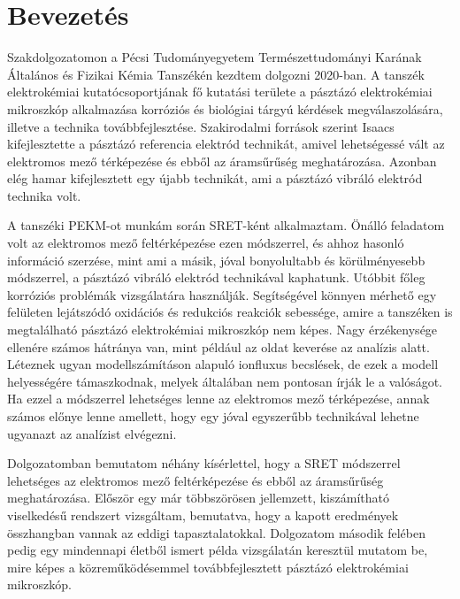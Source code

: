 \chapter{Bevezetés}
\pagestyle{headings}

Szakdolgozatomon a Pécsi Tudományegyetem Természettudományi Karának Általános és Fizikai Kémia Tanszékén kezdtem dolgozni 2020-ban. A tanszék elektrokémiai kutatócsoportjának fő kutatási területe a pásztázó elektrokémiai mikroszkóp alkalmazása korróziós és biológiai tárgyú kérdések megválaszolására, illetve a technika továbbfejlesztése. Szakirodalmi források szerint Isaacs kifejlesztette a pásztázó referencia elektród technikát, amivel lehetségessé vált az elektromos mező térképezése és ebből az áramsűrűség meghatározása. Azonban elég hamar kifejlesztett egy újabb technikát, ami a pásztázó vibráló elektród technika volt.

A tanszéki PEKM-ot munkám során SRET-ként alkalmaztam. Önálló feladatom volt az elektromos mező feltérképezése ezen módszerrel, és ahhoz hasonló információ szerzése, mint ami a másik, jóval bonyolultabb és körülményesebb módszerrel, a pásztázó vibráló elektród technikával kaphatunk. Utóbbit főleg korróziós problémák vizsgálatára használják. Segítségével könnyen mérhető egy felületen lejátszódó oxidációs és redukciós reakciók sebessége, amire a tanszéken is megtalálható pásztázó elektrokémiai mikroszkóp nem képes. Nagy érzékenysége ellenére számos hátránya van, mint például az oldat keverése az analízis alatt. Léteznek ugyan modellszámításon alapuló ionfluxus becslések, de ezek a modell helyességére támaszkodnak, melyek általában nem pontosan írják le a valóságot. Ha ezzel a módszerrel lehetséges lenne az elektromos mező térképezése, annak számos előnye lenne amellett, hogy egy jóval egyszerűbb technikával lehetne ugyanazt az analízist elvégezni.

Dolgozatomban bemutatom néhány kísérlettel, hogy a SRET módszerrel lehetséges az elektromos mező feltérképezése és ebből az áramsűrűség meghatározása. Először egy már többszörösen jellemzett, kiszámítható viselkedésű rendszert vizsgáltam, bemutatva, hogy a kapott eredmények összhangban vannak az eddigi tapasztalatokkal. Dolgozatom második felében pedig egy mindennapi életből ismert példa vizsgálatán keresztül mutatom be, mire képes a közreműködésemmel továbbfejlesztett pásztázó elektrokémiai mikroszkóp.
